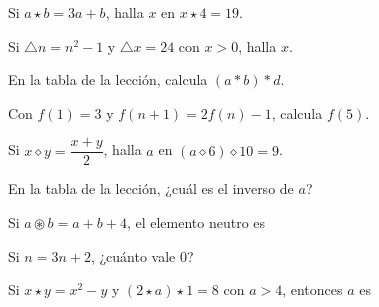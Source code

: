\taller
{}
\begin{ejercicios}
\item Si $a \star b = 3a + b$, halla $x$ en $x \star 4 = 19$. 
\item Si $\triangle n = n^2 - 1$ y $\triangle x = 24$ con $x > 0$, halla $x$. 
\item En la tabla de la lección, calcula $(a \ast b) \ast d$. 
\end{ejercicios}
\begin{ejercicios}
\item Con $f(1) = 3$ y $f(n + 1) = 2f(n) - 1$, calcula $f(5)$. 
\item Si $x \diamond y = \dfrac{x + y}{2}$, halla $a$ en $(a \diamond 6) \diamond 10 = 9$. 
\item En la tabla de la lección, ¿cuál es el inverso de $a$? 
\end{ejercicios}
\begin{ejercicios}
\item Si $a \circledast b = a + b + 4$, el elemento neutro es
\item Si $\boxed{n} = 3n + 2$, ¿cuánto vale $\boxed{\boxed{\boxed{0}}}$?
\item Si $x \star y = x^2 - y$ y $(2 \star a) \star 1 = 8$ con $a > 4$, entonces $a$ es
\end{ejercicios}

\bitacora


